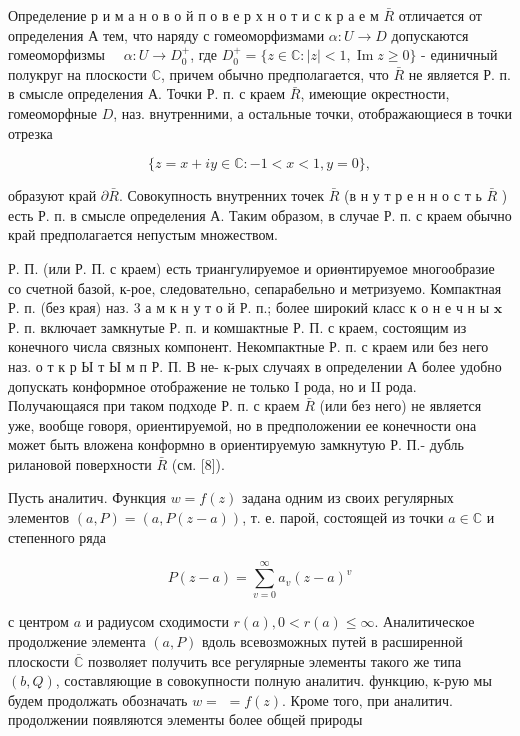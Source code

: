 \documentclass[10pt]{article}
\begin{document}
Определение р и м а н о в о й п о в е р х н о т и с к р а е м $\bar{R}$ отличается от определения А тем, что наряду с гомеоморфизмами $\alpha: U \rightarrow D$ допускаются гомеоморфизмы $\quad \alpha: U \rightarrow D_{0}^{+}$, где $D_{0}^{+}=\{z \in \mathbb{C}:|z|<1, \operatorname{Im} z \geqslant 0\}$ - единичный полукруг на плоскости $\mathbb{C}$, причем обычно предполагается, что $\bar{R}$ не является Р. п. в смысле определения А. Точки Р. п. с краем $\bar{R}$, имеющие окрестности, гомеоморфные $D$, наз. внутренними, а остальные точки, отображающиеся в точки отрезка



\[

\{z=x+i y \in \mathbb{C}:-1<x<1, y=0\},

\]



образуют край $\partial \bar{R}$. Совокупность внутренних точек $\bar{R}$ (в н у т р е н н о с т ь $\bar{R}$ ) есть Р. п. в смысле определения А. Таким образом, в случае Р. п. с краем обычно край предполагается непустым множеством.



Р. П. (или Р. П. с краем) есть триангулируемое и ориөнтируемое многообразие со счетной базой, к-рое, следовательно, сепарабельно и метризуемо. Компактная Р. п. (без края) наз. 3 а м к н у т о й Р. п.; более широкий класс к о н е ч н ы $\mathbf{x}$ Р. п. включает замкнутые Р. п. и комшактные Р. П. с краем, состоящим из конечного числа связных компонент. Некомпактные Р. п. с краем или без него наз. о т к р Ы т Ы м п Р. П. В не- к-рых случаях в определении А более удобно допускать конформное отображение не только I рода, но и II рода. Получающаяся при таком подходе Р. п. с краем $\bar{R}$ (или без него) не является уже, вообще говоря, ориентируемой, но в предположении ее конечности она может быть вложена конформно в ориентируемую замкнутую Р. П.- дубль рилановой поверхности $\bar{R}$ (см. [8]).



Пусть аналитич. Функция $w=f(z)$ задана одним из своих регулярных элементов $(a, P)=(a, P(z-a))$, т. е. парой, состоящей из точки $a \in \mathbb{C}$ и степенного ряда



\[

P(z-a)=\sum_{v=0}^{\infty} a_{v}(z-a)^{v}

\]



с центром $a$ и радиусом сходимости $r(a), 0<r(a) \leqslant \infty$. Аналитическое продолжение элемента $(a, P)$ вдоль всевозможных путей в расширенной плоскости $\overline{\mathbb{C}}$ позволяет получить все регулярные элементы такого же типа $(b, Q)$, составляющие в совокупности полную аналитич. функцию, к-рую мы будем продолжать обозначать $w=$ $=f(z)$. Кроме того, при аналитич. продолжении появляются элементы более общей природы
\end{document}
